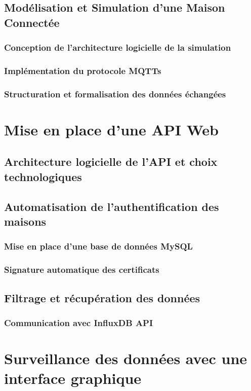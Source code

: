 \documentclass[10pt, a4paper]{report}
\begin{document}
	\subsection{Modélisation et Simulation d'une Maison Connectée}
	\subsubsection{Conception de l'architecture logicielle de la simulation}
	\subsubsection{Implémentation du protocole MQTTs}
	\subsubsection{Structuration et formalisation des données échangées}
	
	\section{Mise en place d'une API Web}
	\subsection{Architecture logicielle de l'API et choix technologiques}
	\subsection{Automatisation de l'authentification des maisons}
	\subsubsection{Mise en place d'une base de données MySQL}
	\subsubsection{Signature automatique des certificats}
	\subsection{Filtrage et récupération des données}
	\subsubsection{Communication avec InfluxDB API}
	
	\section{Surveillance des données avec une interface graphique}
\end{document}
